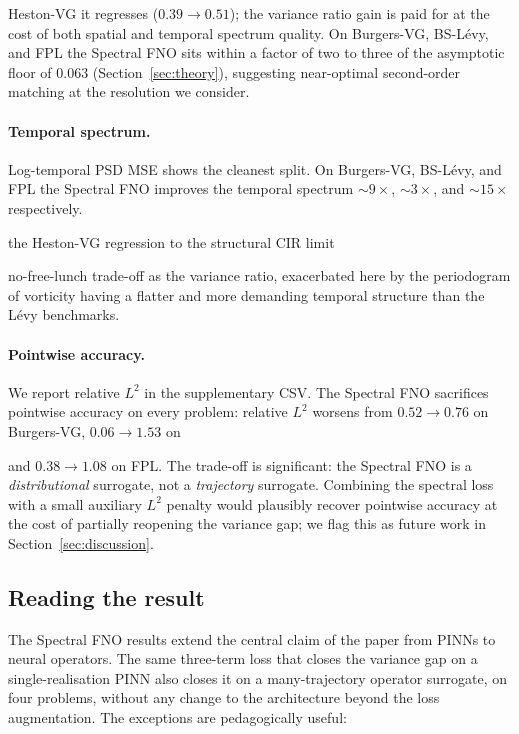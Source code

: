 \documentclass[review,12pt]{elsarticle}
\begin{document}
Heston-VG it regresses ($0.39 \to 0.51$); the variance ratio gain is
paid for at the cost of both spatial and temporal spectrum quality.
On Burgers-VG, BS-L\'evy, and FPL the Spectral FNO sits within a
factor of two to three of the asymptotic floor of $0.063$
(Section~\ref{sec:theory}), suggesting near-optimal second-order
matching at the resolution we consider.

\paragraph{Temporal spectrum.}
Log-temporal PSD MSE shows the cleanest split. On Burgers-VG,
BS-L\'evy, and FPL the Spectral FNO improves the temporal spectrum
$\sim 9\times$, $\sim 3\times$, and $\sim 15\times$ respectively.

the Heston-VG regression to the structural CIR limit

no-free-lunch trade-off as the variance ratio, exacerbated here by
the periodogram of vorticity having a flatter and more demanding
temporal structure than the L\'evy benchmarks.

\paragraph{Pointwise accuracy.}
We report relative $L^2$ in the supplementary CSV. The Spectral FNO
sacrifices pointwise accuracy on every problem: relative $L^2$
worsens from $0.52 \to 0.76$ on Burgers-VG, $0.06 \to 1.53$ on

and $0.38 \to 1.08$ on FPL. The trade-off is significant: the
Spectral FNO is a \emph{distributional} surrogate, not a
\emph{trajectory} surrogate. Combining the spectral loss with a
small auxiliary $L^2$ penalty would plausibly recover pointwise
accuracy at the cost of partially reopening the variance gap; we
flag this as future work in Section~\ref{sec:discussion}.

\subsection{Reading the result}
\label{subsec:fno-reading}

The Spectral FNO results extend the central claim of the paper from
PINNs to neural operators. The same three-term loss that closes
the variance gap on a single-realisation PINN also closes it on a
many-trajectory operator surrogate, on four problems,
without any change to the architecture beyond the loss
augmentation. The exceptions are pedagogically useful:
\end{document}
